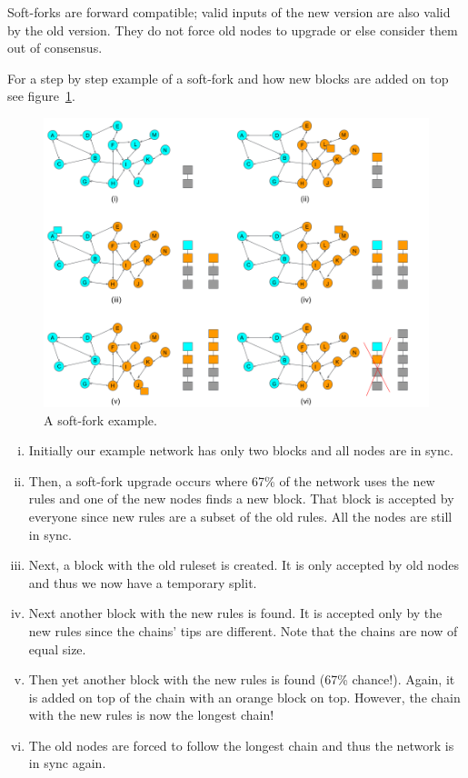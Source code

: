Soft-forks are forward compatible; valid inputs of the new version are also valid by the old version. They do not force old nodes to upgrade or else consider them out of consensus.

For a step by step example of a soft-fork and how new blocks are added on top see figure~\ref{fig:soft-fork-example}.

\begin{figure}[h]
\begin{center}
\includegraphics[scale=0.4]{images/soft-fork-example}
\caption{A soft-fork example.}
\label{fig:soft-fork-example}
\end{center}
\end{figure}

\begin{enumerate}[(i)]
\item Initially our example network has only two blocks and all nodes are in sync.
\item Then, a soft-fork upgrade occurs where 67\% of the network uses the new rules and one of the new nodes finds a new block. That block is accepted by everyone since new rules are a subset of the old rules. All the nodes are still in sync.
\item Next, a block with the old ruleset is created. It is only accepted by old nodes and thus we now have a temporary split.
\item Next another block with the new rules is found. It is accepted only by the new rules since the chains' tips are different. Note that the chains are now of equal size.
\item Then yet another block with the new rules is found (67\% chance!). Again, it is added on top of the chain with an orange block on top. However, the chain with the new rules is now the longest chain! 
\item The old nodes are forced to follow the longest chain and thus the network is in sync again.
\end{enumerate}

